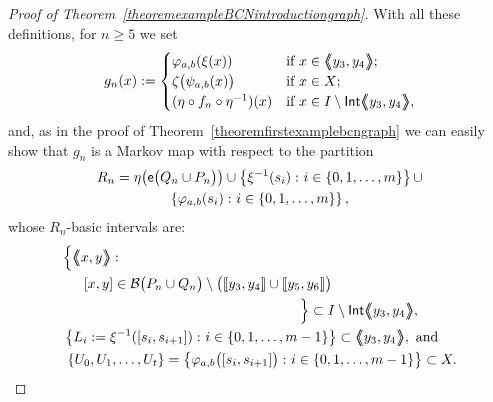 \documentclass[a4paper, 11pt]{amsart}
\numberwithin{equation}{section}
\theoremstyle{customnumberedtheorem}
\theoremstyle{definitionwithbfnote}
\DeclareMathOperator{\Int}{\textsf{\upshape Int}}
\DeclareMathOperator{\eexp}{\textsf{\upshape e}}
\newcommand{\set}[2]{\ensuremath{\left\{#1 \,\colon #2\right\}}}
\newcommand{\BIclass}[1]{\ensuremath{\llbracket #1\rrbracket}}
\newcommand{\BIgraph}[1]{\ensuremath{\mathopen{\bigl\langle\mkern-7.8mu\bigl\langle\mspace{-6.5mu}\bigl\langle} #1 \mathclose{\bigr\rangle\mspace{-6.5mu}\bigr\rangle\mkern-7.8mu\bigr\rangle}}}
\newcommand{\bigemap}[1]{\ensuremath{\eexp\bigl(#1\bigr)}}
\newcommand{\bigeta}[1]{\ensuremath{\eta\bigl(#1\bigr)}}
\def\calB{\mathcal{B}}
\newcommand{\bigSBI}[1]{\ensuremath{\calB\bigl(#1\bigr)}}
\begin{document}
\begin{proof}[Proof of Theorem~\ref{theoremexampleBCNintroductiongraph}]
With all these definitions, for $n \ge 5$ we set
\[
  g_n(x) := \begin{cases}
      \varphi_{a,b} (\xi(x)) & \text{if $x \in \BIgraph{y_3, y_4}$;}\\
      \zeta \bigl(\psi_{a,b}(x)\bigr)  & \text{if $x\in X$;}\\
      (\eta \circ f_n \circ \eta^{-1})(x) & \text{if $x \in I\setminus\Int\BIgraph{y_3, y_4},$}
\end{cases}
\]
and, as in the proof of Theorem~\ref{theoremfirstexamplebcngraph}
we can easily show that $g_n$ is a Markov map
with respect to the partition
\begin{multline*}
R_n = \bigeta{\bigemap{Q_n \cup P_n}} \cup
      \set{\xi^{-1}(s_i)}{i \in \{0,1,\dots,m\}} \cup \\
      \set{\varphi_{a,b}(s_i)}{i \in \{0,1,\dots,m\}},
\end{multline*}
whose $R_n$-basic intervals are:
\begin{align*}
&\Bigl\{\BIgraph{x,y} \,\colon \\
&\hspace*{1.5em}[x,y] \in \bigSBI{P_n \cup Q_n} \setminus \bigl( \BIclass{y_3, y_4} \cup \BIclass{y_5, y_6} \bigr)\\
&\hspace*{17em}\Bigr\} \subset I\setminus\Int\BIgraph{y_3, y_4},\\
& \set{L_i := \xi^{-1}([s_i,s_{i+1}])}{i\in\{0,1,\dots,m-1\}} \subset \BIgraph{y_3, y_4}, \text{ and}\\
&\ \{U_0, U_1,\dots,U_t\} = \set{\varphi_{a,b}\bigl([s_i,s_{i+1}]\bigr)}{i\in\{0,1,\dots,m-1\}} \subset X.
\end{align*}


\end{proof}
\end{document}
